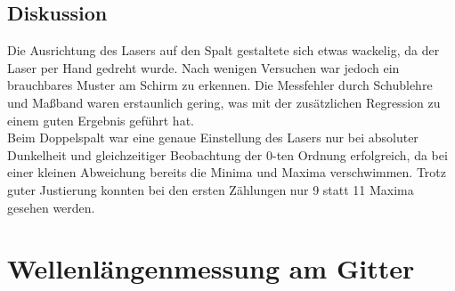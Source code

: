 \documentclass[12pt,a4paper]{article}
\begin{document}
\begin{multicols}{2}
\subsection{Diskussion}
Die Ausrichtung des Lasers auf den Spalt gestaltete sich etwas wackelig, da der Laser per Hand gedreht wurde. Nach wenigen Versuchen war jedoch ein brauchbares Muster am Schirm zu erkennen. Die Messfehler durch Schublehre und Maßband waren erstaunlich gering, was mit der zusätzlichen Regression zu einem guten Ergebnis geführt hat.\\
Beim Doppelspalt war eine genaue Einstellung des Lasers nur bei absoluter Dunkelheit und gleichzeitiger Beobachtung der 0-ten Ordnung erfolgreich, da bei einer kleinen Abweichung bereits die Minima und Maxima verschwimmen. Trotz guter Justierung konnten bei den ersten Zählungen nur 9 statt 11 Maxima gesehen werden.  

\section{Wellenlängenmessung am Gitter}


\end{multicols}
\end{document}
